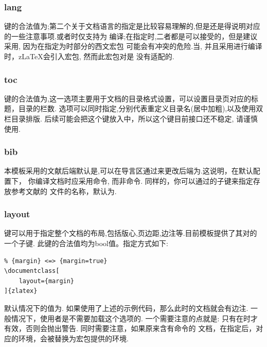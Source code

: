 \subsubsection{lang}
键的合法值为;第二个关于文档语言的指定是比较容易理解的,但是还是得说明对应的一些注意事项.或者时仅支持为
编译;在指定时,二者都是可以接受的，但是建议采用, 因为在指定为时部分的西文宏包
可能会有冲突的危险.当, 并且采用进行编译时，z\LaTeX{}会引入宏包, 然而此宏包对是
没有适配的.

\subsubsection{toc}
键的合法值为,这一选项主要用于文档的目录格式设置，可以设置目录页对应的标题，目录的栏数.
选项可以同时指定,分别代表重定义目录名(居中加粗),以及使用双栏目录排版.
后续可能会把这个键放入中，所以这个键目前接口还不稳定, 请谨慎使用.

\subsubsection{bib}
本模板采用的文献后端默认是,可以在导言区通过来更改后端为.这说明，在默认配置下，
你编译文档时应采用命令, 而非命令. 同样的，你可以通过的子键来指定存放参考文献的
文件的名称，默认为. 

\subsubsection{layout}
键可以用于指定整个文档的布局,包括版心,页边距,边注等.目前模板提供了其对的一个子键.
此键的合法值均为bool值。指定方式如下:
\begin{verbatim}
% {margin} <=> {margin=true}
\documentclass[
    layout={margin}
]{zlatex}
\end{verbatim}

默认情况下的值为. 如果使用了上述的示例代码，那么此时的文档就会有边注. 一般情况下，使用者是不需要加载这个选项的. 
一个需要注意的点就是: 只有在时才有效，否则会抛出警告. 同时需要注意，如果原来含有\cmd{\marginpar}命令的
文档，在指定后，对应的\cmd{\marginpar}环境，会被替换为宏包提供的环境.

